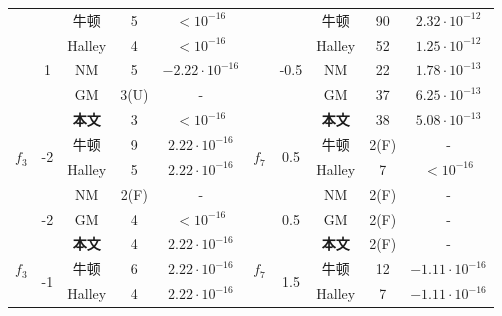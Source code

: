 \begin{center}
\begin{longtable}[!htbp]{c|c|ccc|c|c|ccc}
 \cline{2-5}\cline{7-10}
    & 	\multirow{5}{*}{1}  & 	牛顿  & 	5  & 	$< 10^{-16}$&	   & 	\multirow{5}{*}{-0.5}  & 	牛顿  & 	90  & 	$2.32 \cdot 10^{-12}$\\
 
    & 	   & 	Halley  & 	4  & 	$< 10^{-16}$&	   & 	   & 	Halley  & 	52  & 	$1.25 \cdot 10^{-12}$\\
 
    & 	   & 	NM  & 	5  & 	$-2.22 \cdot 10^{-16}$&	   & 	   & 	NM  & 	22  & 	$1.78 \cdot 10^{-13}$\\
 
    & 	   & 	GM  & 	3(U)  & 	$\text{-}$&	   & 	   & 	GM  & 	37  & 	$6.25 \cdot 10^{-13}$\\
 
    & 	   & 	\textbf{本文}  & 	3  & 	$< 10^{-16}$&	   & 	   & 	\textbf{本文}  & 	38  & 	$5.08 \cdot 10^{-13}$\\
 
 \cline{2-5}\cline{7-10}
 \hline



    \multirow{2}{*}{$f_3$} & 	\multirow{2}{*}{-2}  & 	牛顿  & 	9  & 	$2.22 \cdot 10^{-16}$&	\multirow{2}{*}{$f_7$}    & 	\multirow{2}{*}{0.5}  & 	牛顿  & 	2(F)  & 	$\text{-}$\\

    & 	   & 	Halley  & 	5  & 	$2.22 \cdot 10^{-16}$&	   & 	   & 	Halley  & 	7  & 	$< 10^{-16}$\\

    & 	\multirow{3}{*}{-2}     & 	NM  & 	2(F)  & 	$\text{-}$&	   & 	\multirow{3}{*}{0.5}     & 	NM  & 	2(F)  & 	$\text{-}$\\

    & 	   & 	GM  & 	4  & 	$< 10^{-16}$&	   & 	   & 	GM  & 	2(F)  & 	$\text{-}$\\

    \multirow{4}{*}{$f_3$}& 	   & 	\textbf{本文}  & 	4  & 	$2.22 \cdot 10^{-16}$&	 \multirow{4}{*}{$f_7$}  & 	   & 	\textbf{本文}  & 	2(F)  & 	$\text{-}$\\

\cline{2-5}\cline{7-10}
    & 	\multirow{5}{*}{-1}  & 	牛顿  & 	6  & 	$2.22 \cdot 10^{-16}$&	   & 	\multirow{5}{*}{1.5}  & 	牛顿  & 	12  & 	$-1.11 \cdot 10^{-16}$\\

    & 	   & 	Halley  & 	4  & 	$2.22 \cdot 10^{-16}$&	   & 	   & 	Halley  & 	7  & 	$-1.11 \cdot 10^{-16}$\\


\end{longtable}
\end{center}
